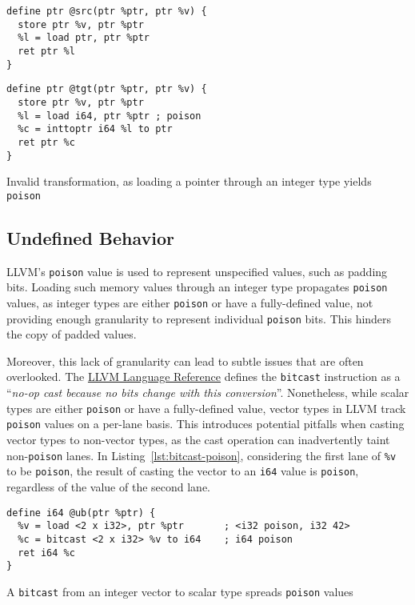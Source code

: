 \documentclass[a4paper,12pt]{article}
\begin{document}
\begin{listing}[h]
  \begin{minipage}{0.5\textwidth}
    \begin{verbatim}
define ptr @src(ptr %ptr, ptr %v) {
  store ptr %v, ptr %ptr
  %l = load ptr, ptr %ptr
  ret ptr %l
}
    \end{verbatim}
  \end{minipage}
  \begin{minipage}{0.45\textwidth}
    \begin{verbatim}
define ptr @tgt(ptr %ptr, ptr %v) {
  store ptr %v, ptr %ptr
  %l = load i64, ptr %ptr ; poison
  %c = inttoptr i64 %l to ptr
  ret ptr %c
}
    \end{verbatim}
  \end{minipage}
  \caption{Invalid transformation, as loading a pointer through an integer type yields \texttt{poison}}
  \label{lst:poison-int}
\end{listing}

\subsection{Undefined Behavior}

LLVM’s \texttt{poison} value is used to represent unspecified values, such as padding bits.
Loading such memory values through an integer type propagates \texttt{poison} values, as integer types are either \texttt{poison} or have a fully-defined value, not providing enough granularity to represent individual \texttt{poison} bits.
This hinders the copy of padded values.

Moreover, this lack of granularity can lead to subtle issues that are often overlooked.
The \href{https://llvm.org/docs/LangRef.html#bitcast-to-instruction}{LLVM Language Reference} defines the \texttt{bitcast} instruction as a ``\textit{no-op cast because no bits change with this conversion}''.
Nonetheless, while scalar types are either \texttt{poison} or have a fully-defined value, vector types in LLVM track \texttt{poison} values on a per-lane basis.
This introduces potential pitfalls when casting vector types to non-vector types, as the cast operation can inadvertently taint non-\texttt{poison} lanes.
In Listing~\ref{lst:bitcast-poison}, considering the first lane of \texttt{\%v} to be \texttt{poison}, the result of casting the vector to an \texttt{i64} value is \texttt{poison}, regardless of the value of the second lane.

\begin{listing}[h]
  \begin{verbatim}
define i64 @ub(ptr %ptr) {
  %v = load <2 x i32>, ptr %ptr       ; <i32 poison, i32 42>
  %c = bitcast <2 x i32> %v to i64    ; i64 poison
  ret i64 %c
}
  \end{verbatim}
  \caption{A \texttt{bitcast} from an integer vector to scalar type spreads \texttt{poison} values}
  \label{lst:bitcast-poison}
\end{listing}
\end{document}
